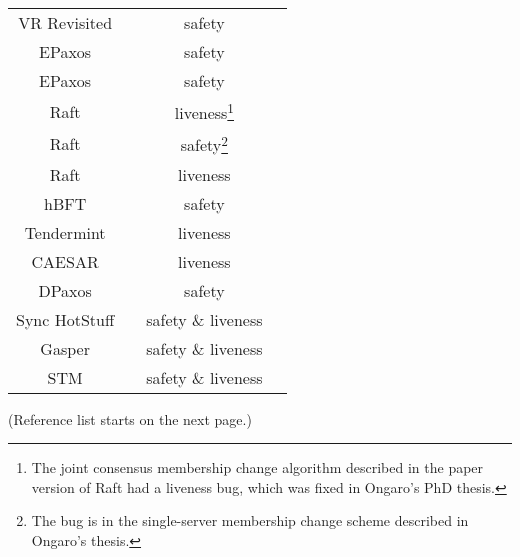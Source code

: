 \documentclass{article}
\begin{document}
\begin{center}
\begin{tabular}{ c c c c }
    VR Revisited & \cite{liskovViewstampedReplicationRevisited2012} & safety &
    \cite{michaelRecoveringSharedObjects2017} \\

    EPaxos & \cite{moraruThereMoreConsensus2013} & safety &
    \cite{sutraCorrectnessEgalitarianPaxos2020} \\

    EPaxos & \cite{moraruThereMoreConsensus2013} & safety &
    \cite{whittakerEPaxosDependencySet2021} \\

    Raft & \cite{ongaroSearchUnderstandableConsensus2014} &
    liveness\footnote{The joint consensus membership change algorithm described
    in the paper version of Raft had a liveness bug, which was fixed in
    Ongaro's PhD thesis.} & \cite{hochConfigurationChanges2014} \\

    Raft & \cite{ongaroConsensusBridgingTheory2014} & safety\footnote{The bug
    is in the single-server membership change scheme described in Ongaro's
    thesis.} & \cite{amos15812TermPaper2015,
    ongaroBugSingleserverMembership2015} \\

    Raft & \cite{ongaroSearchUnderstandableConsensus2014,
    ongaroConsensusBridgingTheory2014} & liveness &
    \cite{howardRaftDoesNot2020, jensenExaminingRaftBehaviour2021} \\

    hBFT & \cite{duanHBFTSpeculativeByzantine2015} & safety &
    \cite{shresthaRevisitingHBFTSpeculative2019} \\

    Tendermint & \cite{buchmanTendermintByzantineFault2016} & liveness &
    \cite{cachinBlockchainConsensusProtocols2017} \\

    CAESAR & \cite{arunSpeedingConsensusChasing2017} & liveness &
    \cite{enesEfficientReplicationTimestamp2021} \\

    DPaxos & \cite{nawabDPaxosManagingData2018} & safety &
    \cite{whittakerMatchmakerPaxosReconfigurable2021} \\

    Sync HotStuff & \cite{abrahamSyncHotStuffSimple2019} & safety \& liveness &
    \cite{momoseForceLockingAttackSync2019} \\

    Gasper & \cite{buterinCombiningGHOSTCasper2020} & safety \& liveness &
    \cite{neuEbbandFlowProtocolsResolution2021} \\

    STM & \cite{Imbs2011} & safety \& liveness &
    \cite{Belyaev2010} \\

    \bottomrule
\end{tabular}
\end{center}

\vspace*{\fill}
\begin{center}
(Reference list starts on the next page.)
\end{center}
\vspace*{\fill}

\newpage
\printbibliography
\end{document}
